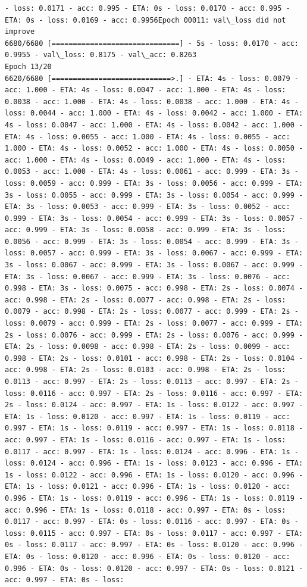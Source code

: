 \documentclass[11pt]{article}
\begin{document}
\begin{Verbatim}[commandchars=\\\{\}]
- loss: 0.0171 - acc: 0.995 - ETA: 0s - loss: 0.0170 - acc: 0.995 - ETA: 0s - loss: 0.0169 - acc: 0.9956Epoch 00011: val\_loss did not improve
6680/6680 [==============================] - 5s - loss: 0.0170 - acc: 0.9955 - val\_loss: 0.8175 - val\_acc: 0.8263
Epoch 13/20
6620/6680 [============================>.] - ETA: 4s - loss: 0.0079 - acc: 1.000 - ETA: 4s - loss: 0.0047 - acc: 1.000 - ETA: 4s - loss: 0.0038 - acc: 1.000 - ETA: 4s - loss: 0.0038 - acc: 1.000 - ETA: 4s - loss: 0.0044 - acc: 1.000 - ETA: 4s - loss: 0.0042 - acc: 1.000 - ETA: 4s - loss: 0.0047 - acc: 1.000 - ETA: 4s - loss: 0.0042 - acc: 1.000 - ETA: 4s - loss: 0.0055 - acc: 1.000 - ETA: 4s - loss: 0.0055 - acc: 1.000 - ETA: 4s - loss: 0.0052 - acc: 1.000 - ETA: 4s - loss: 0.0050 - acc: 1.000 - ETA: 4s - loss: 0.0049 - acc: 1.000 - ETA: 4s - loss: 0.0053 - acc: 1.000 - ETA: 4s - loss: 0.0061 - acc: 0.999 - ETA: 3s - loss: 0.0059 - acc: 0.999 - ETA: 3s - loss: 0.0056 - acc: 0.999 - ETA: 3s - loss: 0.0055 - acc: 0.999 - ETA: 3s - loss: 0.0054 - acc: 0.999 - ETA: 3s - loss: 0.0053 - acc: 0.999 - ETA: 3s - loss: 0.0052 - acc: 0.999 - ETA: 3s - loss: 0.0054 - acc: 0.999 - ETA: 3s - loss: 0.0057 - acc: 0.999 - ETA: 3s - loss: 0.0058 - acc: 0.999 - ETA: 3s - loss: 0.0056 - acc: 0.999 - ETA: 3s - loss: 0.0054 - acc: 0.999 - ETA: 3s - loss: 0.0057 - acc: 0.999 - ETA: 3s - loss: 0.0067 - acc: 0.999 - ETA: 3s - loss: 0.0067 - acc: 0.999 - ETA: 3s - loss: 0.0067 - acc: 0.999 - ETA: 3s - loss: 0.0067 - acc: 0.999 - ETA: 3s - loss: 0.0076 - acc: 0.998 - ETA: 3s - loss: 0.0075 - acc: 0.998 - ETA: 2s - loss: 0.0074 - acc: 0.998 - ETA: 2s - loss: 0.0077 - acc: 0.998 - ETA: 2s - loss: 0.0079 - acc: 0.998 - ETA: 2s - loss: 0.0077 - acc: 0.999 - ETA: 2s - loss: 0.0079 - acc: 0.999 - ETA: 2s - loss: 0.0077 - acc: 0.999 - ETA: 2s - loss: 0.0076 - acc: 0.999 - ETA: 2s - loss: 0.0076 - acc: 0.999 - ETA: 2s - loss: 0.0098 - acc: 0.998 - ETA: 2s - loss: 0.0099 - acc: 0.998 - ETA: 2s - loss: 0.0101 - acc: 0.998 - ETA: 2s - loss: 0.0104 - acc: 0.998 - ETA: 2s - loss: 0.0103 - acc: 0.998 - ETA: 2s - loss: 0.0113 - acc: 0.997 - ETA: 2s - loss: 0.0113 - acc: 0.997 - ETA: 2s - loss: 0.0116 - acc: 0.997 - ETA: 2s - loss: 0.0116 - acc: 0.997 - ETA: 2s - loss: 0.0124 - acc: 0.997 - ETA: 1s - loss: 0.0122 - acc: 0.997 - ETA: 1s - loss: 0.0120 - acc: 0.997 - ETA: 1s - loss: 0.0119 - acc: 0.997 - ETA: 1s - loss: 0.0119 - acc: 0.997 - ETA: 1s - loss: 0.0118 - acc: 0.997 - ETA: 1s - loss: 0.0116 - acc: 0.997 - ETA: 1s - loss: 0.0117 - acc: 0.997 - ETA: 1s - loss: 0.0124 - acc: 0.996 - ETA: 1s - loss: 0.0124 - acc: 0.996 - ETA: 1s - loss: 0.0123 - acc: 0.996 - ETA: 1s - loss: 0.0122 - acc: 0.996 - ETA: 1s - loss: 0.0120 - acc: 0.996 - ETA: 1s - loss: 0.0121 - acc: 0.996 - ETA: 1s - loss: 0.0120 - acc: 0.996 - ETA: 1s - loss: 0.0119 - acc: 0.996 - ETA: 1s - loss: 0.0119 - acc: 0.996 - ETA: 1s - loss: 0.0118 - acc: 0.997 - ETA: 0s - loss: 0.0117 - acc: 0.997 - ETA: 0s - loss: 0.0116 - acc: 0.997 - ETA: 0s - loss: 0.0115 - acc: 0.997 - ETA: 0s - loss: 0.0117 - acc: 0.997 - ETA: 0s - loss: 0.0117 - acc: 0.997 - ETA: 0s - loss: 0.0120 - acc: 0.996 - ETA: 0s - loss: 0.0120 - acc: 0.996 - ETA: 0s - loss: 0.0120 - acc: 0.996 - ETA: 0s - loss: 0.0120 - acc: 0.997 - ETA: 0s - loss: 0.0121 - acc: 0.997 - ETA: 0s - loss: 
\end{Verbatim}
\end{document}

